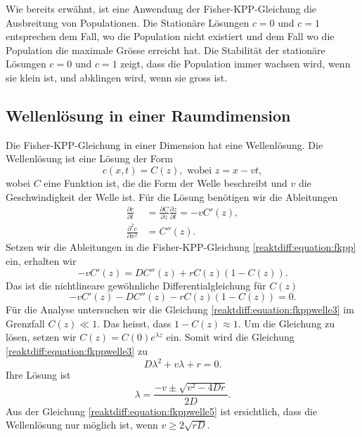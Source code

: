 Wie bereits erwähnt, ist eine Anwendung der Fisher-KPP-Gleichung die Ausbreitung von Populationen.
Die Stationäre Lösungen \(c = 0\) und \(c = 1\) entsprechen dem Fall, wo die Population nicht existiert und dem Fall wo die Population die maximale Grösse erreicht hat.
Die Stabilität der stationäre Lösungen \(c = 0\) und \(c = 1\) zeigt, dass die Population immer wachsen wird, wenn sie klein ist, und abklingen wird, wenn sie gross ist.

\subsection{Wellenlösung in einer Raumdimension
\label{reaktdiff:subsection:fkppwelle}}
Die Fisher-KPP-Gleichung in einer Dimension hat eine Wellenlösung.
Die Wellenlösung ist eine Lösung der Form
\begin{equation*}
\label{reaktdiff:equation:fkppwelle}
c(x,t) = C(z), \text{ wobei } z = x - vt,
\end{equation*}
wobei \(C\) eine Funktion ist, die die Form der Welle beschreibt und \(v\) die Geschwindigkeit der Welle ist.
Für die Lösung benötigen wir die Ableitungen
\begin{align*}
\frac{\partial c}{\partial t} &= \frac{\partial C}{\partial z}\frac{\partial z}{\partial t} = -vC'(z),
\\
\frac{\partial^2 c}{\partial x^2} &= C''(z).
\end{align*}
Setzen wir die Ableitungen in die Fisher-KPP-Gleichung \eqref{reaktdiff:equation:fkpp} ein, erhalten wir
\begin{equation*}
\label{reaktdiff:equation:fkppwelle2}
-vC'(z) = D C''(z) + rC(z)(1-C(z)).
\end{equation*}
Das ist die nichtlineare gewöhnliche Differentialgleichung für \(C(z)\)
\begin{equation}
    \label{reaktdiff:equation:fkppwelle3}
    -vC'(z) - D C''(z) - rC(z)(1-C(z)) = 0.
\end{equation}
Für die Analyse untersuchen wir die Gleichung \eqref{reaktdiff:equation:fkppwelle3} im Grenzfall \(C(z) \ll 1\).
Das heisst, dass \(1 - C(z)\approx 1\).
Um die Gleichung zu lösen, setzen wir \(C(z) = C(0) e^{\lambda z}\) ein.
Somit wird die Gleichung \eqref{reaktdiff:equation:fkppwelle3} zu
\begin{equation*}
D\lambda^2 + v\lambda + r = 0.
\end{equation*}
Ihre Lösung ist
\begin{equation}
\label{reaktdiff:equation:fkppwelle5}
\lambda = \frac{-v \pm \sqrt{v^2 - 4Dr}}{2D}.
\end{equation}
Aus der Gleichung \eqref{reaktdiff:equation:fkppwelle5} ist ersichtlich, dass die Wellenlösung nur möglich ist, wenn \(v \ge 2\sqrt{rD}\).

